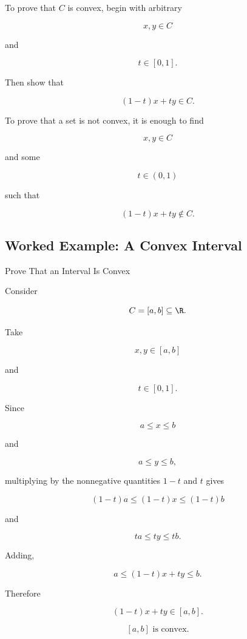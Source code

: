 To prove that \(C\) is convex, begin with arbitrary

\[
x,y\in C
\]

and

\[
t\in[0,1].
\]

Then show that

\[
\boxed{
(1-t)x+ty\in C.
}
\]

To prove that a set is not convex, it is enough to find

\[
x,y\in C
\]

and some

\[
t\in(0,1)
\]

such that

\[
\boxed{
(1-t)x+ty\notin C.
}
\]

\subsection{Worked Example: A Convex Interval}
\label{subsec:worked-convex-interval}

\begin{workedexamplebox}{Prove That an Interval Is Convex}

Consider

\[
C=[a,b]\subseteq\R.
\]

Take

\[
x,y\in[a,b]
\]

and

\[
t\in[0,1].
\]

Since

\[
a\leq x\leq b
\]

and

\[
a\leq y\leq b,
\]

multiplying by the nonnegative quantities \(1-t\) and \(t\) gives

\[
(1-t)a\leq(1-t)x\leq(1-t)b
\]

and

\[
ta\leq ty\leq tb.
\]

Adding,

\[
a
\leq
(1-t)x+ty
\leq
b.
\]

Therefore

\[
(1-t)x+ty\in[a,b].
\]

\begin{answerbox}
\[
\boxed{
[a,b]\text{ is convex.}
}
\]
\end{answerbox}
\end{workedexamplebox}

